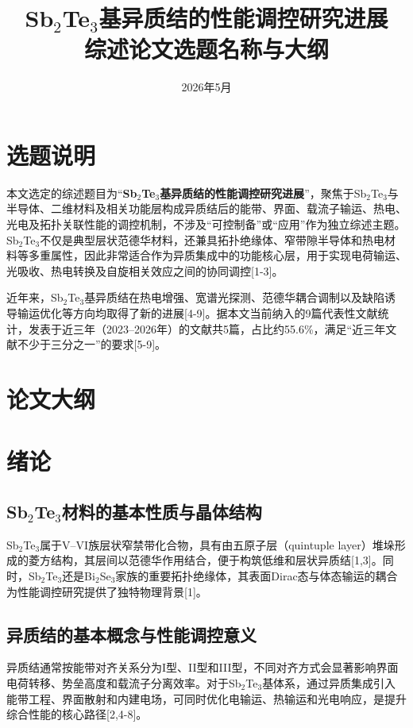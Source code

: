 \documentclass[12pt,a4paper]{ctexart}
\title{\texorpdfstring{Sb$_2$Te$_3$}{Sb2Te3}基异质结的性能调控研究进展\\\large 综述论文选题名称与大纲}
\author{}
\date{2026年5月}
\begin{document}
\maketitle

\section*{选题说明}
本文选定的综述题目为“\textbf{Sb$_2$Te$_3$基异质结的性能调控研究进展}”，聚焦于Sb$_2$Te$_3$与半导体、二维材料及相关功能层构成异质结后的能带、界面、载流子输运、热电、光电及拓扑关联性能的调控机制，不涉及“可控制备”或“应用”作为独立综述主题。Sb$_2$Te$_3$不仅是典型层状范德华材料，还兼具拓扑绝缘体、窄带隙半导体和热电材料等多重属性，因此非常适合作为异质集成中的功能核心层，用于实现电荷输运、光吸收、热电转换及自旋相关效应之间的协同调控[1-3]。

近年来，Sb$_2$Te$_3$基异质结在热电增强、宽谱光探测、范德华耦合调制以及缺陷诱导输运优化等方向均取得了新的进展[4-9]。据本文当前纳入的9篇代表性文献统计，发表于近三年（2023--2026年）的文献共5篇，占比约55.6\%，满足“近三年文献不少于三分之一”的要求[5-9]。

\section*{论文大纲}

\section{绪论}

\subsection{\texorpdfstring{Sb$_2$Te$_3$}{Sb2Te3}材料的基本性质与晶体结构}
Sb$_2$Te$_3$属于V--VI族层状窄禁带化合物，具有由五原子层（quintuple layer）堆垛形成的菱方结构，其层间以范德华作用结合，便于构筑低维和层状异质结[1,3]。同时，Sb$_2$Te$_3$还是Bi$_2$Se$_3$家族的重要拓扑绝缘体，其表面Dirac态与体态输运的耦合为性能调控研究提供了独特物理背景[1]。

\subsection{异质结的基本概念与性能调控意义}
异质结通常按能带对齐关系分为I型、II型和III型，不同对齐方式会显著影响界面电荷转移、势垒高度和载流子分离效率。对于Sb$_2$Te$_3$基体系，通过异质集成引入能带工程、界面散射和内建电场，可同时优化电输运、热输运和光电响应，是提升综合性能的核心路径[2,4-8]。
\end{document}
